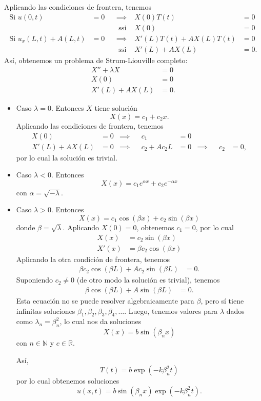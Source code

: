 \documentclass[11pt,letterpaper,draft]{report}
\newcommand\R{\mathbb R}
\newcommand\N{\mathbb N}
\newcommand\<{\langle}
\renewcommand\>{\rangle}
\begin{document}
Aplicando las condiciones de frontera, tenemos
\begin{align*}
  \text{Si } u(0,t)&=0
  & &\implies &
  X(0)T(t)&=0 \\
  && &\text{ ssi } &
  X(0)&=0 \\
  \text{Si } u_x(L,t)+A(L,t)&=0
  & &\implies &
  X'(L)T(t)+AX(L)T(t)&=0 \\
  && &\text{ ssi } &
  X'(L)+AX(L)&=0.
\end{align*}
Así, obtenemos un problema de Strum-Liouville completo:
\begin{align*}
  X''+\lambda X &= 0 \\
  X(0) &= 0 \\
  X'(L) + AX(L) &= 0.
\end{align*}
\begin{itemize}
  \item Caso $\lambda=0$.
  Entonces $X$ tiene solución
  \[
    X(x) = c_1 + c_2x
  .\]
  Aplicando las condiciones de frontera, tenemos
  \begin{align*}
    X(0)&=0
    &\implies &&
    c_1&=0
    \\
    X'(L)+AX(L)&=0
    &\implies &&
    c_2+Ac_2L&=0
    &\implies &&
    c_2 &= 0,
  \end{align*}
  por lo cual la solución es trivial.

  \item Caso $\lambda<0$.
  Entonces
  \[
    X(x) = c_1e^{\alpha x} + c_2e^{-\alpha x}
  \]
  con $\alpha=\sqrt{-\lambda}$.

  \item Caso $\lambda>0$.
  Entonces
  \[
    X(x) = c_1\cos(\beta x) + c_2\sin(\beta x)
  \]
  donde $\beta = \sqrt\lambda$.
  Aplicando $X(0)=0$, obtenemos $c_1=0$, por lo cual
  \begin{align*}
    X(x) &= c_2\sin(\beta x) \\
    X'(x) &= \beta c_2\cos(\beta x)
  \end{align*}
  Aplicando la otra condición de frontera, tenemos
  \begin{align*}
    \beta c_2\cos(\beta L)+Ac_2\sin(\beta L) &= 0.
  \end{align*}
  Suponiendo $c_2\neq 0$ (de otro modo la solución es trivial),
  tenemos
  \begin{align*}
    \beta\cos(\beta L)+A\sin(\beta L) &= 0.
  \end{align*}
  Esta ecuación no se puede resolver algebraicamente para
  $\beta$, pero sí tiene infinitas soluciones
  $\beta_1,\beta_2,\beta_3,\beta_4,\dots$.
  Luego, tenemos valores para $\lambda$ dados como
  $\lambda_n=\beta_n^2$, lo cual nos da soluciones
  \[
    X(x) = b\sin(\beta_n x)
  \]
  con $n\in\N$ y $c\in\R$.

  Así,
  \[
    T(t) = b\exp(-k\beta_n^2 t)
  \]
  por lo cual obtenemos soluciones
  \[
    u(x,t)
    =b\sin(\beta_n x)\exp(-k\beta_n^2 t)
  .\]
\end{itemize}
\end{document}
